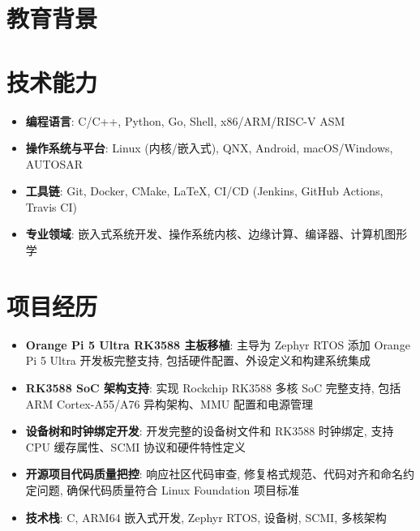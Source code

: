 \documentclass{resume}
\begin{document}
\lastupdated


\section{教育背景}

\section{技术能力}
\begin{itemize}[parsep=0.2ex]
  \item \textbf{编程语言}: C/C++, Python, Go, Shell, x86/ARM/RISC-V ASM
  \item \textbf{操作系统与平台}: Linux (内核/嵌入式), QNX, Android, macOS/Windows, AUTOSAR
  \item \textbf{工具链}: Git, Docker, CMake, \LaTeX, CI/CD (Jenkins, GitHub Actions, Travis CI)
  \item \textbf{专业领域}: 嵌入式系统开发、操作系统内核、边缘计算、编译器、计算机图形学
\end{itemize}

\section{项目经历}
\begin{itemize}
  \item \textbf{Orange Pi 5 Ultra RK3588 主板移植}: 主导为 Zephyr RTOS 添加 Orange Pi 5 Ultra 开发板完整支持, 包括硬件配置、外设定义和构建系统集成
  \item \textbf{RK3588 SoC 架构支持}: 实现 Rockchip RK3588 多核 SoC 完整支持, 包括 ARM Cortex-A55/A76 异构架构、MMU 配置和电源管理
  \item \textbf{设备树和时钟绑定开发}: 开发完整的设备树文件和 RK3588 时钟绑定, 支持 CPU 缓存属性、SCMI 协议和硬件特性定义
  \item \textbf{开源项目代码质量把控}: 响应社区代码审查, 修复格式规范、代码对齐和命名约定问题, 确保代码质量符合 Linux Foundation 项目标准
  \item \textbf{技术栈}: C, ARM64 嵌入式开发, Zephyr RTOS, 设备树, SCMI, 多核架构
\end{itemize}
\end{document}
